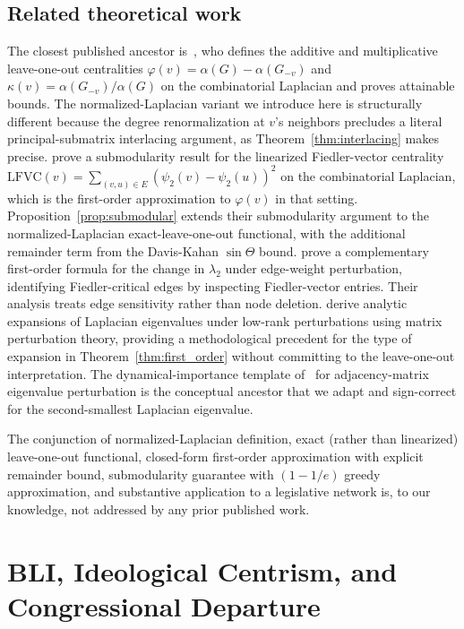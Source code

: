 \documentclass[12pt, a4paper]{article}
\begin{document}
\subsection{Related theoretical work}\label{subsec:bli_related}

The closest published ancestor is~\citet{kirkland2010algebraic}, who defines the additive and multiplicative leave-one-out centralities $\varphi(v) = \alpha(G) - \alpha(G_{-v})$ and $\kappa(v) = \alpha(G_{-v})/\alpha(G)$ on the combinatorial Laplacian and proves attainable bounds. The normalized-Laplacian variant we introduce here is structurally different because the degree renormalization at $v$'s neighbors precludes a literal principal-submatrix interlacing argument, as Theorem~\ref{thm:interlacing} makes precise. \citet{chen2014local} prove a submodularity result for the linearized Fiedler-vector centrality $\mathrm{LFVC}(v) = \sum_{(v, u) \in E} (\psi_2(v) - \psi_2(u))^2$ on the combinatorial Laplacian, which is the first-order approximation to $\varphi(v)$ in that setting. Proposition~\ref{prop:submodular} extends their submodularity argument to the normalized-Laplacian exact-leave-one-out functional, with the additional remainder term from the Davis-Kahan $\sin\Theta$ bound. \citet{noschese2025perron} prove a complementary first-order formula for the change in $\lambda_2$ under edge-weight perturbation, identifying Fiedler-critical edges by inspecting Fiedler-vector entries. Their analysis treats edge sensitivity rather than node deletion. \citet{vanmieghem2025some} derive analytic expansions of Laplacian eigenvalues under low-rank perturbations using matrix perturbation theory, providing a methodological precedent for the type of expansion in Theorem~\ref{thm:first_order} without committing to the leave-one-out interpretation. The dynamical-importance template of~\citet{restrepo2006characterizing} for adjacency-matrix eigenvalue perturbation is the conceptual ancestor that we adapt and sign-correct for the second-smallest Laplacian eigenvalue.

The conjunction of normalized-Laplacian definition, exact (rather than linearized) leave-one-out functional, closed-form first-order approximation with explicit remainder bound, submodularity guarantee with $(1 - 1/e)$ greedy approximation, and substantive application to a legislative network is, to our knowledge, not addressed by any prior published work.

\FloatBarrier
\section{BLI, Ideological Centrism, and Congressional Departure}\label{sec:bli_departure}
\end{document}
